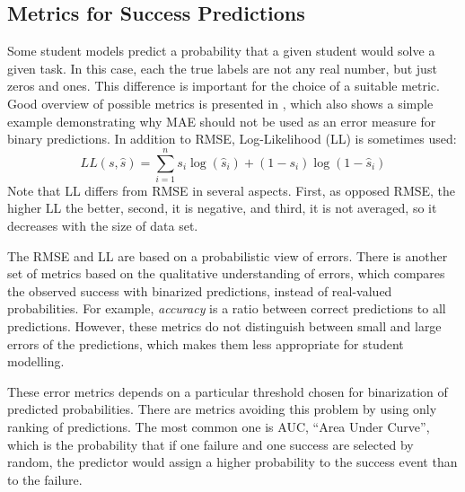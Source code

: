 

\subsection{Metrics for Success Predictions}
\label{sec:metrics-for-success-predictions}

Some student models predict a probability that
  a given student would solve a given task.
In this case, each the true labels are not any real number,
  but just zeros and ones.
This difference is important for the choice of a suitable metric.
Good overview of possible metrics is presented in \cite{pelanek-evaluation-student-models},
  which also shows a simple example demonstrating why MAE should not be used
  as an error measure for binary predictions.
In addition to RMSE, Log-Likelihood (LL) is sometimes used:
$$
LL(s, \hat{s}) = \sum_{i=1}^n s_i\log(\hat{s}_i) + (1-s_i)\log(1-\hat{s}_i)
$$
Note that LL differs from RMSE in several aspects.
First, as opposed RMSE, the higher LL the better,
second, it is negative,
and third, it is not averaged, so it decreases with the size of data set.

The RMSE and LL are based on a probabilistic view of errors.
There is another set of metrics based on the qualitative understanding of errors,
  which compares the observed success with binarized predictions,
  instead of real-valued probabilities.
For example, \emph{accuracy} is a ratio between correct predictions to all predictions.
However, these metrics do not distinguish between small and large errors of the predictions,
  which makes them less appropriate for student modelling.


These error metrics depends on a particular threshold chosen
  for binarization of predicted probabilities.
There are metrics avoiding this problem by using only ranking of predictions.
The most common one is AUC, ``Area Under Curve'',
  which is the probability that if one failure and one success are selected by random,
  the predictor would assign a higher probability to the success event than to the failure.

